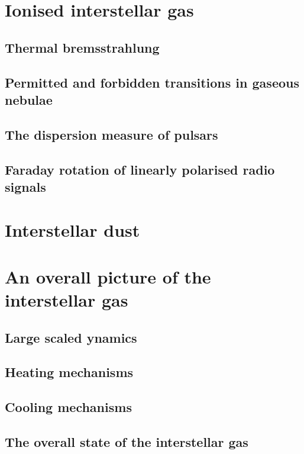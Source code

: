 \documentclass[12pt,a4paper]{article}
\begin{document}
\section{Ionised interstellar gas}


\subsection{Thermal bremsstrahlung}


\subsection{Permitted and forbidden transitions in gaseous nebulae}


\subsection{The dispersion measure of pulsars}



\subsection{Faraday rotation of linearly polarised radio signals}



\section{Interstellar dust}



\section{An overall picture of the interstellar gas}


\subsection{Large scaled ynamics}


\subsection{Heating mechanisms}


\subsection{Cooling mechanisms}


\subsection{The overall state of the interstellar gas}
\end{document}

